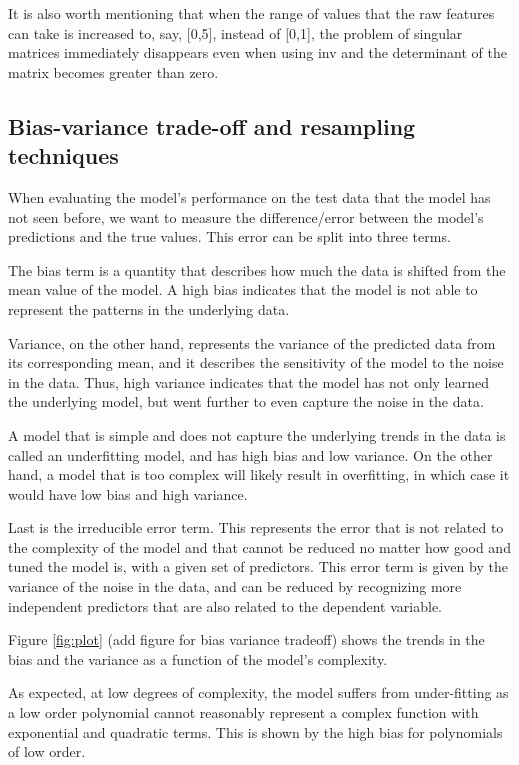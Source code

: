 \documentclass{article}
\begin{document}
It is also worth mentioning that when the range of values that the raw features can take is increased to, say, [0,5], instead of [0,1], the problem of singular matrices immediately disappears even when using inv and the determinant of the matrix  becomes greater than zero.

\subsection{Bias-variance trade-off and resampling techniques}
When evaluating the model’s performance on the test data that the model has not seen before, we want to measure the difference/error between the model’s predictions and the true values. This error can be split into three terms.

The bias term is a quantity that describes how much the data is shifted from the mean value of the model. A high bias indicates that the model is not able to represent the patterns in the underlying data.

Variance, on the other hand, represents the variance of the predicted data from its corresponding mean, and it describes the sensitivity of the model to the noise in the data. Thus, high variance indicates that the model has not only learned the underlying model, but went further to even capture the noise in the data.

A model that is simple and does not capture the underlying trends in the data is called an underfitting model, and has high bias and low variance. On the other hand, a model that is too complex will likely result in overfitting, in which case it would have low bias and high variance.

Last is the irreducible error term. This represents the error that is not related to the complexity of the model and that cannot be reduced no matter how good and tuned the model is, with a given set of predictors. This error term is given by the variance of the noise in the data, and can be reduced by recognizing more independent predictors that are also related to the dependent variable.

Figure \ref{fig:plot} (add figure for bias variance tradeoff) shows the trends in the bias and the variance as a function of the model’s complexity. 

As expected, at low degrees of complexity, the model suffers from under-fitting as a low order polynomial cannot reasonably represent a complex function with exponential and quadratic terms. This is shown by the high bias for polynomials of low order.
\end{document}
